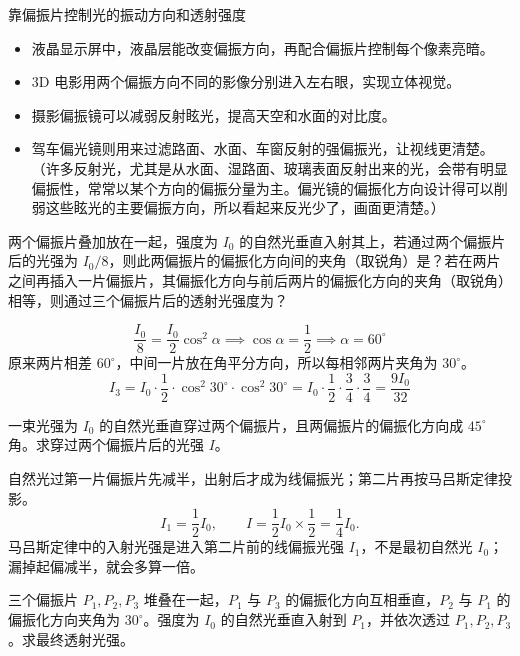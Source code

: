 \documentclass[lang=cn,11pt]{elegantbook}
\begin{document}
\begin{note}
    靠偏振片控制光的振动方向和透射强度
    \begin{itemize}
    \item 液晶显示屏中，液晶层能改变偏振方向，再配合偏振片控制每个像素亮暗。
    \item 3D 电影用两个偏振方向不同的影像分别进入左右眼，实现立体视觉。
    \item 摄影偏振镜可以减弱反射眩光，提高天空和水面的对比度。
    \item 驾车偏光镜则用来过滤路面、水面、车窗反射的强偏振光，让视线更清楚。（许多反射光，尤其是从水面、湿路面、玻璃表面反射出来的光，会带有明显偏振性，常常以某个方向的偏振分量为主。偏光镜的偏振化方向设计得可以削弱这些眩光的主要偏振方向，所以看起来反光少了，画面更清楚。）
    \end{itemize}
\end{note}

\begin{exercise}[两片偏振片]
两个偏振片叠加放在一起，强度为 \(I_0\) 的自然光垂直入射其上，若通过两个偏振片后的光强为 \(I_0/8\)，则此两偏振片的偏振化方向间的夹角（取锐角）是？若在两片之间再插入一片偏振片，其偏振化方向与前后两片的偏振化方向的夹角（取锐角）相等，则通过三个偏振片后的透射光强度为？
\end{exercise}
\begin{solution}
\[\frac{I_0}{8}=\frac{I_0}{2}\cos^2\alpha\implies \cos\alpha=\frac12\implies \alpha=60^\circ\]
原来两片相差 \(60^\circ\)，中间一片放在角平分方向，所以每相邻两片夹角为 \(30^\circ\)。
\[I_3=I_0\cdot\frac12\cdot\cos^2 30^\circ\cdot\cos^2 30^\circ=I_0\cdot\frac12\cdot\frac34\cdot\frac34=\frac{9I_0}{32}\]
\end{solution}

\begin{exercise}
一束光强为 \(I_0\) 的自然光垂直穿过两个偏振片，且两偏振片的偏振化方向成 \(45^\circ\) 角。求穿过两个偏振片后的光强 \(I\)。
\end{exercise}

\begin{solution}
自然光过第一片偏振片先减半，出射后才成为线偏振光；第二片再按马吕斯定律投影。
\[
I_1=\frac12 I_0,\qquad
I=\frac12 I_0\times \frac12
=\frac14 I_0.
\]
马吕斯定律中的入射光强是进入第二片前的线偏振光强 \(I_1\)，不是最初自然光 \(I_0\)；漏掉起偏减半，就会多算一倍。
\end{solution}

\begin{exercise}
三个偏振片 \(P_1,P_2,P_3\) 堆叠在一起，\(P_1\) 与 \(P_3\) 的偏振化方向互相垂直，\(P_2\) 与 \(P_1\) 的偏振化方向夹角为 \(30^\circ\)。强度为 \(I_0\) 的自然光垂直入射到 \(P_1\)，并依次透过 \(P_1,P_2,P_3\)。求最终透射光强。
\end{exercise}
\end{document}
